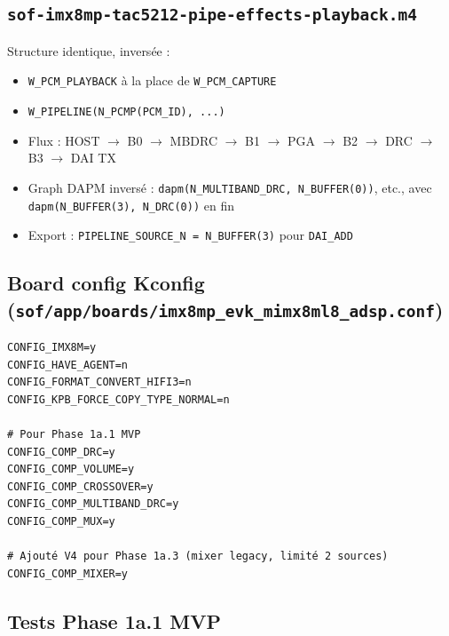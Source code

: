 \documentclass[11pt,a4paper]{article}
\begin{document}
\subsection{\texttt{sof-imx8mp-tac5212-pipe-effects-playback.m4}}

Structure identique, inversée :
\begin{itemize}[leftmargin=*, itemsep=1pt]
  \item \texttt{W\_PCM\_PLAYBACK} à la place de \texttt{W\_PCM\_CAPTURE}
  \item \texttt{W\_PIPELINE(N\_PCMP(PCM\_ID), ...)}
  \item Flux : HOST $\to$ B0 $\to$ MBDRC $\to$ B1 $\to$ PGA $\to$ B2 $\to$ DRC $\to$ B3 $\to$ DAI TX
  \item Graph DAPM inversé : \texttt{dapm(N\_MULTIBAND\_DRC, N\_BUFFER(0))}, etc., avec \texttt{dapm(N\_BUFFER(3), N\_DRC(0))} en fin
  \item Export : \texttt{PIPELINE\_SOURCE\_N = N\_BUFFER(3)} pour \texttt{DAI\_ADD}
\end{itemize}

\subsection{Board config Kconfig (\texttt{sof/app/boards/imx8mp\_evk\_mimx8ml8\_adsp.conf})}

\begin{lstlisting}[language={}, basicstyle=\ttfamily\scriptsize]
CONFIG_IMX8M=y
CONFIG_HAVE_AGENT=n
CONFIG_FORMAT_CONVERT_HIFI3=n
CONFIG_KPB_FORCE_COPY_TYPE_NORMAL=n

# Pour Phase 1a.1 MVP
CONFIG_COMP_DRC=y
CONFIG_COMP_VOLUME=y
CONFIG_COMP_CROSSOVER=y
CONFIG_COMP_MULTIBAND_DRC=y
CONFIG_COMP_MUX=y

# Ajouté V4 pour Phase 1a.3 (mixer legacy, limité 2 sources)
CONFIG_COMP_MIXER=y
\end{lstlisting}

\subsection{Tests Phase 1a.1 MVP}
\end{document}
